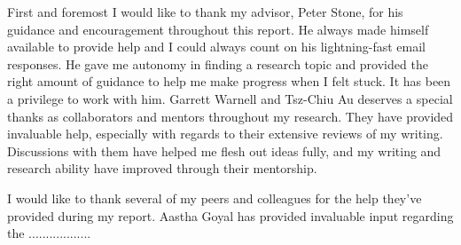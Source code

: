 \documentclass[12pt]{report}
\begin{document}
\justify 
\noindent

\thesiscopyrightpage                 %

\thesiscertificationpage             %

\thesistitlepage                     %


\thesisdedicationpage                %


\begin{thesisacknowledgments}        %
First and foremost I would like to thank my advisor, Peter Stone, for his guidance and encouragement throughout this report. He always made himself available to provide help and I could always count on his lightning-fast email responses. He gave me autonomy in finding a research topic and provided the right amount of guidance to help me make progress when I felt stuck. It has been a privilege to work with him. Garrett Warnell and Tsz-Chiu Au deserves a special thanks as collaborators and mentors throughout my research. They have provided invaluable help, especially with regards to their extensive reviews of my writing. Discussions with them have helped me flesh out ideas fully, and my writing and research ability have improved through their mentorship.    

I would like to thank several of my peers and colleagues for the help they’ve provided during my report. Aastha Goyal has provided invaluable input regarding the ..................

\end{thesisacknowledgments}          
\end{document}
